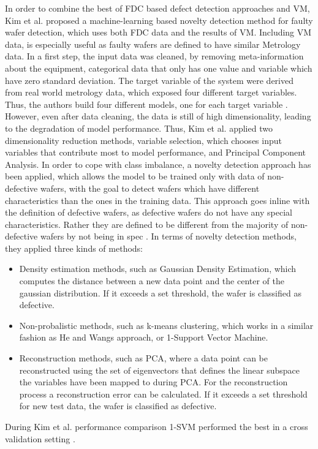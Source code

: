 \documentclass{Academic}
\begin{document}
    In order to combine the best of FDC based defect detection approaches and VM, Kim et al. \cite{kim_machine_2012} proposed a machine-learning based novelty detection method for faulty wafer detection, which uses both FDC data and the results of VM. Including VM data, is especially useful as faulty wafers are defined to have similar Metrology data. In a first step, the input data was cleaned, by removing meta-information about the equipment, categorical data that only has one value and variable which have zero standard deviation. The target variable of the system were derived from real world metrology data, which exposed four different target variables. Thus, the authors build four different models, one for each target variable \cite{kim_machine_2012}. However, even after data cleaning, the data is still of high dimensionality, leading to the degradation of model performance. Thus, Kim et al. applied two dimensionality reduction methods, variable selection, which chooses input variables that contribute most to model performance, and Principal Component Analysis. In order to cope with class imbalance, a novelty detection approach has been applied, which allows the model to be trained only with data of non-defective wafers, with the goal to detect wafers which have different characteristics than the ones in the training data. This approach goes inline with the definition of defective wafers, as defective wafers do not have any special characteristics. Rather they are defined to be different from the majority of non-defective wafers by not being in spec \cite{kim_machine_2012}. In terms of novelty detection methods, they applied three kinds of methods:
    \begin{itemize}
        \item Density estimation methods, such as Gaussian Density Estimation, which computes the distance between a new data point and the center of the gaussian distribution. If it exceeds a set threshold, the wafer is classified as defective.
        \item Non-probalistic methods, such as k-means clustering, which works in a similar fashion as He and Wangs approach, or 1-Support Vector Machine.
        \item Reconstruction methods, such as PCA, where a data point can be reconstructed using the set of eigenvectors that defines the linear subspace the variables have been mapped to during PCA. For the reconstruction process a reconstruction error can be calculated. If it exceeds a set threshold for new test data, the wafer is classified as defective.
    \end{itemize}
    During Kim et al. performance comparison 1-SVM performed the best in a cross validation setting \cite{kim_machine_2012}.
\end{document}
